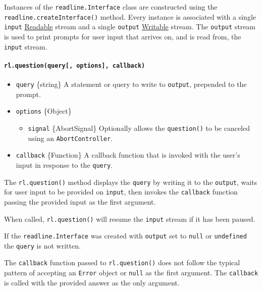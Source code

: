 Instances of the \texttt{readline.Interface} class are constructed using
the \texttt{readline.createInterface()} method. Every instance is
associated with a single \texttt{input}
\href{stream.md\#readable-streams}{Readable} stream and a single
\texttt{output} \href{stream.md\#writable-streams}{Writable} stream. The
\texttt{output} stream is used to print prompts for user input that
arrives on, and is read from, the \texttt{input} stream.

\paragraph{\texorpdfstring{\texttt{rl.question(query{[},\ options{]},\ callback)}}{rl.question(query{[}, options{]}, callback)}}\label{rl.questionquery-options-callback}

\begin{itemize}
\tightlist
\item
  \texttt{query} \{string\} A statement or query to write to
  \texttt{output}, prepended to the prompt.
\item
  \texttt{options} \{Object\}

  \begin{itemize}
  \tightlist
  \item
    \texttt{signal} \{AbortSignal\} Optionally allows the
    \texttt{question()} to be canceled using an
    \texttt{AbortController}.
  \end{itemize}
\item
  \texttt{callback} \{Function\} A callback function that is invoked
  with the user's input in response to the \texttt{query}.
\end{itemize}

The \texttt{rl.question()} method displays the \texttt{query} by writing
it to the \texttt{output}, waits for user input to be provided on
\texttt{input}, then invokes the \texttt{callback} function passing the
provided input as the first argument.

When called, \texttt{rl.question()} will resume the \texttt{input}
stream if it has been paused.

If the \texttt{readline.Interface} was created with \texttt{output} set
to \texttt{null} or \texttt{undefined} the \texttt{query} is not
written.

The \texttt{callback} function passed to \texttt{rl.question()} does not
follow the typical pattern of accepting an \texttt{Error} object or
\texttt{null} as the first argument. The \texttt{callback} is called
with the provided answer as the only argument.

